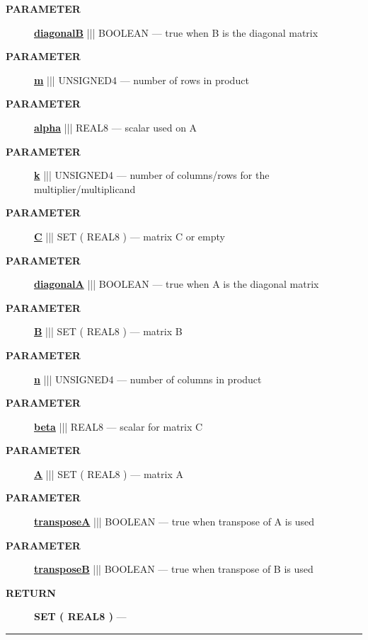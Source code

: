 \par
\begin{description}
\item [\colorbox{tagtype}{\color{white} \textbf{\textsf{PARAMETER}}}] \textbf{\underline{diagonalB}} ||| BOOLEAN --- true when B is the diagonal matrix
\item [\colorbox{tagtype}{\color{white} \textbf{\textsf{PARAMETER}}}] \textbf{\underline{m}} ||| UNSIGNED4 --- number of rows in product
\item [\colorbox{tagtype}{\color{white} \textbf{\textsf{PARAMETER}}}] \textbf{\underline{alpha}} ||| REAL8 --- scalar used on A
\item [\colorbox{tagtype}{\color{white} \textbf{\textsf{PARAMETER}}}] \textbf{\underline{k}} ||| UNSIGNED4 --- number of columns/rows for the multiplier/multiplicand
\item [\colorbox{tagtype}{\color{white} \textbf{\textsf{PARAMETER}}}] \textbf{\underline{C}} ||| SET ( REAL8 ) --- matrix C or empty
\item [\colorbox{tagtype}{\color{white} \textbf{\textsf{PARAMETER}}}] \textbf{\underline{diagonalA}} ||| BOOLEAN --- true when A is the diagonal matrix
\item [\colorbox{tagtype}{\color{white} \textbf{\textsf{PARAMETER}}}] \textbf{\underline{B}} ||| SET ( REAL8 ) --- matrix B
\item [\colorbox{tagtype}{\color{white} \textbf{\textsf{PARAMETER}}}] \textbf{\underline{n}} ||| UNSIGNED4 --- number of columns in product
\item [\colorbox{tagtype}{\color{white} \textbf{\textsf{PARAMETER}}}] \textbf{\underline{beta}} ||| REAL8 --- scalar for matrix C
\item [\colorbox{tagtype}{\color{white} \textbf{\textsf{PARAMETER}}}] \textbf{\underline{A}} ||| SET ( REAL8 ) --- matrix A
\item [\colorbox{tagtype}{\color{white} \textbf{\textsf{PARAMETER}}}] \textbf{\underline{transposeA}} ||| BOOLEAN --- true when transpose of A is used
\item [\colorbox{tagtype}{\color{white} \textbf{\textsf{PARAMETER}}}] \textbf{\underline{transposeB}} ||| BOOLEAN --- true when transpose of B is used
\end{description}







\par
\begin{description}
\item [\colorbox{tagtype}{\color{white} \textbf{\textsf{RETURN}}}] \textbf{SET ( REAL8 )} --- 
\end{description}




\rule{\linewidth}{0.5pt}
